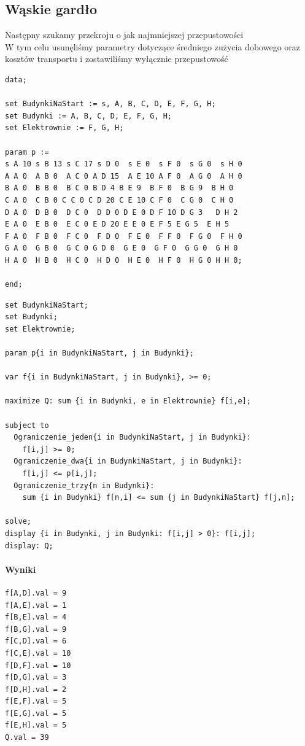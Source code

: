\subsection{Wąskie gardło}
Następny szukamy przekroju o jak najmniejszej przepustowości \\
W tym celu usunęliśmy parametry dotyczące średniego zużycia dobowego oraz kosztów transportu i zostawiliśmy wyłącznie przepustowość
\begin{lstlisting}[caption= plik dat]
data; 
 
set BudynkiNaStart := s, A, B, C, D, E, F, G, H; 
set Budynki := A, B, C, D, E, F, G, H; 
set Elektrownie := F, G, H; 
 
param p := 
s A 10 s B 13 s C 17 s D 0  s E 0  s F 0  s G 0  s H 0
A A 0  A B 0  A C 0 A D 15  A E 10 A F 0  A G 0  A H 0
B A 0  B B 0  B C 0 B D 4 B E 9  B F 0  B G 9  B H 0
C A 0  C B 0 C C 0 C D 20 C E 10 C F 0  C G 0  C H 0   
D A 0  D B 0  D C 0  D D 0 D E 0 D F 10 D G 3   D H 2 
E A 0  E B 0  E C 0 E D 20 E E 0 E F 5 E G 5  E H 5  
F A 0  F B 0  F C 0  F D 0  F E 0  F F 0  F G 0  F H 0
G A 0  G B 0  G C 0 G D 0  G E 0  G F 0  G G 0  G H 0
H A 0  H B 0  H C 0  H D 0  H E 0  H F 0  H G 0 H H 0; 
 
end; 
\end{lstlisting}
\begin{lstlisting}[caption= plik mod]
set BudynkiNaStart; 
set Budynki; 
set Elektrownie; 
 
param p{i in BudynkiNaStart, j in Budynki}; 
 
var f{i in BudynkiNaStart, j in Budynki}, >= 0; 
 
maximize Q: sum {i in Budynki, e in Elektrownie} f[i,e]; 
 
subject to 
  Ograniczenie_jeden{i in BudynkiNaStart, j in Budynki}: 
    f[i,j] >= 0; 
  Ograniczenie_dwa{i in BudynkiNaStart, j in Budynki}: 
    f[i,j] <= p[i,j]; 
  Ograniczenie_trzy{n in Budynki}: 
    sum {i in Budynki} f[n,i] <= sum {j in BudynkiNaStart} f[j,n]; 
 
solve; 
display {i in Budynki, j in Budynki: f[i,j] > 0}: f[i,j]; 
display: Q;
\end{lstlisting}

\paragraph{Wyniki}
\begin{lstlisting}[caption=Wynik z glpk]
f[A,D].val = 9
f[A,E].val = 1
f[B,E].val = 4
f[B,G].val = 9
f[C,D].val = 6
f[C,E].val = 10
f[D,F].val = 10
f[D,G].val = 3
f[D,H].val = 2
f[E,F].val = 5
f[E,G].val = 5
f[E,H].val = 5
Q.val = 39
\end{lstlisting}


